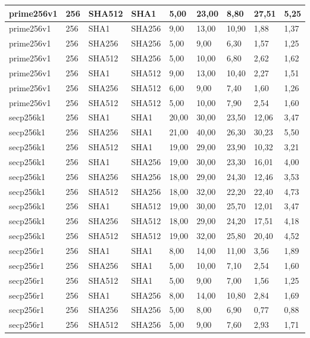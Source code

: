 \begin{longtable}{| l | l | l | l | l |l |l |l |l |}
prime256v1 & 256 & SHA512 & SHA1 & 5,00 & 23,00 & 8,80 & 27,51 & 5,25 \\ \hline 
prime256v1 & 256 & SHA1 & SHA256 & 9,00 & 13,00 & 10,90 & 1,88 & 1,37 \\ \hline 
prime256v1 & 256 & SHA256 & SHA256 & 5,00 & 9,00 & 6,30 & 1,57 & 1,25 \\ \hline 
prime256v1 & 256 & SHA512 & SHA256 & 5,00 & 10,00 & 6,80 & 2,62 & 1,62 \\ \hline 
prime256v1 & 256 & SHA1 & SHA512 & 9,00 & 13,00 & 10,40 & 2,27 & 1,51 \\ \hline 
prime256v1 & 256 & SHA256 & SHA512 & 6,00 & 9,00 & 7,40 & 1,60 & 1,26 \\ \hline 
prime256v1 & 256 & SHA512 & SHA512 & 5,00 & 10,00 & 7,90 & 2,54 & 1,60 \\ \hline 
secp256k1 & 256 & SHA1 & SHA1 & 20,00 & 30,00 & 23,50 & 12,06 & 3,47 \\ \hline 
secp256k1 & 256 & SHA256 & SHA1 & 21,00 & 40,00 & 26,30 & 30,23 & 5,50 \\ \hline 
secp256k1 & 256 & SHA512 & SHA1 & 19,00 & 29,00 & 23,90 & 10,32 & 3,21 \\ \hline 
secp256k1 & 256 & SHA1 & SHA256 & 19,00 & 30,00 & 23,30 & 16,01 & 4,00 \\ \hline 
secp256k1 & 256 & SHA256 & SHA256 & 18,00 & 29,00 & 24,30 & 12,46 & 3,53 \\ \hline 
secp256k1 & 256 & SHA512 & SHA256 & 18,00 & 32,00 & 22,20 & 22,40 & 4,73 \\ \hline 
secp256k1 & 256 & SHA1 & SHA512 & 19,00 & 30,00 & 25,70 & 12,01 & 3,47 \\ \hline 
secp256k1 & 256 & SHA256 & SHA512 & 18,00 & 29,00 & 24,20 & 17,51 & 4,18 \\ \hline 
secp256k1 & 256 & SHA512 & SHA512 & 19,00 & 32,00 & 25,80 & 20,40 & 4,52 \\ \hline 
secp256r1 & 256 & SHA1 & SHA1 & 8,00 & 14,00 & 11,00 & 3,56 & 1,89 \\ \hline 
secp256r1 & 256 & SHA256 & SHA1 & 5,00 & 10,00 & 7,10 & 2,54 & 1,60 \\ \hline 
secp256r1 & 256 & SHA512 & SHA1 & 5,00 & 9,00 & 7,00 & 1,56 & 1,25 \\ \hline 
secp256r1 & 256 & SHA1 & SHA256 & 8,00 & 14,00 & 10,80 & 2,84 & 1,69 \\ \hline 
secp256r1 & 256 & SHA256 & SHA256 & 5,00 & 8,00 & 6,90 & 0,77 & 0,88 \\ \hline 
secp256r1 & 256 & SHA512 & SHA256 & 5,00 & 9,00 & 7,60 & 2,93 & 1,71 \\ \hline 

\end{longtable}
